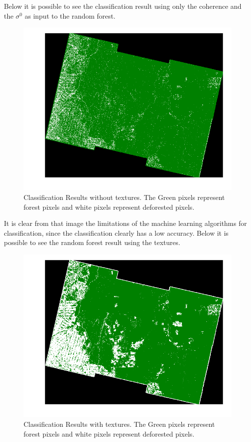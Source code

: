 Below it is possible to see the classification result using only the coherence and the $\sigma^0$ as input to the random forest.
\begin{figure}[H]
    \centering
    \includegraphics[width=\linewidth]{Chapter5/TANDEM-X/result_no_texturesimage.pdf}
    \caption{Classification Results without textures. The Green pixels represent forest pixels and white pixels represent deforested pixels.}
    \label{fig:result_no_textures_sentinel}
\end{figure}{}
It is clear from that image the limitations of the machine learning algorithms for classification, since the classification clearly has a low accuracy. Below it is possible to see the random forest result using the textures.

\begin{figure}[H]
    \centering
    \includegraphics[width=\linewidth]{Chapter5/TANDEM-X/result_texturesimage.pdf}
    \caption{Classification Results with textures. The Green pixels represent forest pixels and white pixels represent deforested pixels.}
    \label{fig:result_textures_sentinel}
\end{figure}{}

